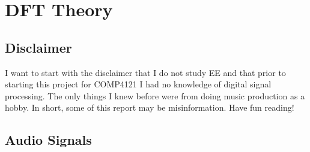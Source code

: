 \section{DFT Theory}
\subsection{Disclaimer}
I want to start with the disclaimer that I do not study EE and that
prior to starting this project for COMP4121 I had no knowledge of digital signal processing.
The only things I knew before were from doing music production as a hobby.
In short, some of this report may be misinformation. Have fun reading!

\subsection{Audio Signals}
\subsection{}